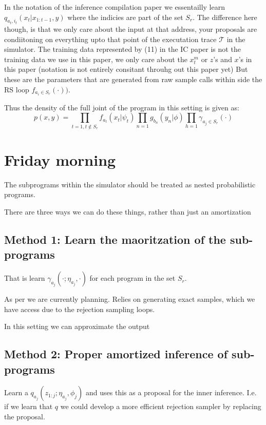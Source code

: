 \documentclass{article}
\begin{document}
In the notation of the inference compilation paper we essentailly learn $q_{a_{t},i_{t}}(x_t| x_{1:t-1}, y)$
where the indicies are part of the set $S_r$.
 The difference here though, is that we only care about the input at that address, your proposals 
 are condiitoning on everything upto that point of the executation trace $\mathcal{T}$
 in the simulator. 
 The training data represented by (11) in the IC paper is not the training data we use in this paper,
 we only care about the $x^{m}_t$ or $z$'s and $x$'s in this paper (notation is not entirely consitant throuhg out this paper yet)
 But these are the parameters that are generated from raw sample calls within side the RS loop $f_{a_i \in S_r}(\cdot))$.

Thus the density of the full joint of the program in this setting is given as:
\begin{equation}
  p(x,y) = \prod_{t=1, t \notin S_r} f_{a_t}(x_t | \psi_t) \prod_{n=1} g_{b_n}(y_n | \phi) \prod_{h=1}\gamma_{a_j \in S_r}(\cdot)
\end{equation}
\section{Friday morning}
The subprograms within the simulator should be treated as nested probabilistic programs. 

There are three ways we can do these things, rather than just an amortization

\subsection{Method 1: Learn the maoritzation of the sub-programs}
That is learn $\gamma_{a_{j}}(\cdot ; \eta_{a_{j}}, \cdot)$ for each program in the set $S_r$. 


As per we are currently planning. Relies on generating exact samples, which 
we have access due to the rejection sampling loops.

In this setting we can approximate the output
\subsection{Method 2: Proper amortized inference of sub-programs}

Learn a $q_{a_{j}}(z_{1:j}; \eta_{a_j}, \phi_j)$ and uses this as a proposal for the 
inner inference. 
I.e. if we learn that $q$ we could develop a more efficient rejection sampler by replacing the proposal. 
\end{document}
